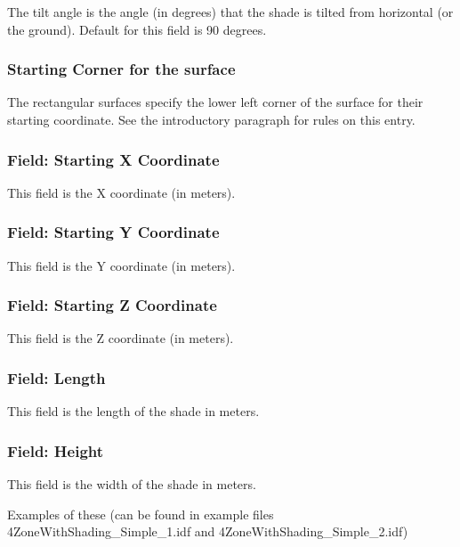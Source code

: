 The tilt angle is the angle (in degrees) that the shade is tilted from horizontal (or the ground). Default for this field is 90 degrees.

\subsubsection{Starting Corner for the surface}\label{starting-corner-for-the-surface-16}

The rectangular surfaces specify the lower left corner of the surface for their starting coordinate. See the introductory paragraph for rules on this entry.

\subsubsection{Field: Starting X Coordinate}\label{field-starting-x-coordinate-16}

This field is the X coordinate (in meters).

\subsubsection{Field: Starting Y Coordinate}\label{field-starting-y-coordinate-10}

This field is the Y coordinate (in meters).

\subsubsection{Field: Starting Z Coordinate}\label{field-starting-z-coordinate-16}

This field is the Z coordinate (in meters).

\subsubsection{Field: Length}\label{field-length-16}

This field is the length of the shade in meters.

\subsubsection{Field: Height}\label{field-height-10}

This field is the width of the shade in meters.

Examples of these (can be found in example files 4ZoneWithShading\_Simple\_1.idf and 4ZoneWithShading\_Simple\_2.idf)

